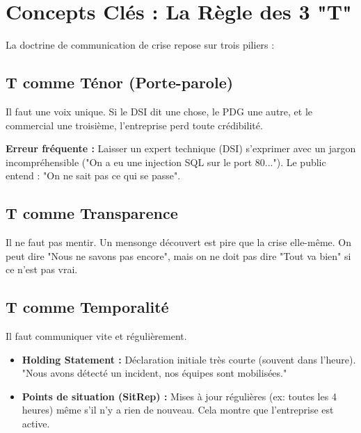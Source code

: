 \section{Concepts Clés : La Règle des 3 "T"}

La doctrine de communication de crise repose sur trois piliers :

\subsection{T comme Ténor (Porte-parole)}

Il faut une voix unique. Si le DSI dit une chose, le PDG une autre, et le commercial une troisième, l'entreprise perd toute crédibilité.

\begin{boxalert}
\textbf{Erreur fréquente :} Laisser un expert technique (DSI) s'exprimer avec un jargon incompréhensible ("On a eu une injection SQL sur le port 80..."). Le public entend : "On ne sait pas ce qui se passe".
\end{boxalert}

\subsection{T comme Transparence}

Il ne faut pas mentir. Un mensonge découvert est pire que la crise elle-même. On peut dire "Nous ne savons pas encore", mais on ne doit pas dire "Tout va bien" si ce n'est pas vrai.

\subsection{T comme Temporalité}

Il faut communiquer vite et régulièrement.
\begin{itemize}
    \item \textbf{Holding Statement :} Déclaration initiale très courte (souvent dans l'heure). "Nous avons détecté un incident, nos équipes sont mobilisées."
    \item \textbf{Points de situation (SitRep) :} Mises à jour régulières (ex: toutes les 4 heures) même s'il n'y a rien de nouveau. Cela montre que l'entreprise est active.
\end{itemize}

